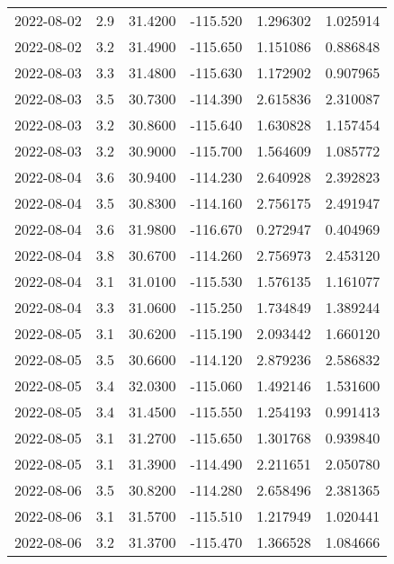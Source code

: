 \begin{tabular}{lrrrrr}
2022-08-02 &       2.9 &  31.4200 &  -115.520 &         1.296302 &         1.025914 \\
2022-08-02 &       3.2 &  31.4900 &  -115.650 &         1.151086 &         0.886848 \\
2022-08-03 &       3.3 &  31.4800 &  -115.630 &         1.172902 &         0.907965 \\
2022-08-03 &       3.5 &  30.7300 &  -114.390 &         2.615836 &         2.310087 \\
2022-08-03 &       3.2 &  30.8600 &  -115.640 &         1.630828 &         1.157454 \\
2022-08-03 &       3.2 &  30.9000 &  -115.700 &         1.564609 &         1.085772 \\
2022-08-04 &       3.6 &  30.9400 &  -114.230 &         2.640928 &         2.392823 \\
2022-08-04 &       3.5 &  30.8300 &  -114.160 &         2.756175 &         2.491947 \\
2022-08-04 &       3.6 &  31.9800 &  -116.670 &         0.272947 &         0.404969 \\
2022-08-04 &       3.8 &  30.6700 &  -114.260 &         2.756973 &         2.453120 \\
2022-08-04 &       3.1 &  31.0100 &  -115.530 &         1.576135 &         1.161077 \\
2022-08-04 &       3.3 &  31.0600 &  -115.250 &         1.734849 &         1.389244 \\
2022-08-05 &       3.1 &  30.6200 &  -115.190 &         2.093442 &         1.660120 \\
2022-08-05 &       3.5 &  30.6600 &  -114.120 &         2.879236 &         2.586832 \\
2022-08-05 &       3.4 &  32.0300 &  -115.060 &         1.492146 &         1.531600 \\
2022-08-05 &       3.4 &  31.4500 &  -115.550 &         1.254193 &         0.991413 \\
2022-08-05 &       3.1 &  31.2700 &  -115.650 &         1.301768 &         0.939840 \\
2022-08-05 &       3.1 &  31.3900 &  -114.490 &         2.211651 &         2.050780 \\
2022-08-06 &       3.5 &  30.8200 &  -114.280 &         2.658496 &         2.381365 \\
2022-08-06 &       3.1 &  31.5700 &  -115.510 &         1.217949 &         1.020441 \\
2022-08-06 &       3.2 &  31.3700 &  -115.470 &         1.366528 &         1.084666 \\

\end{tabular}
